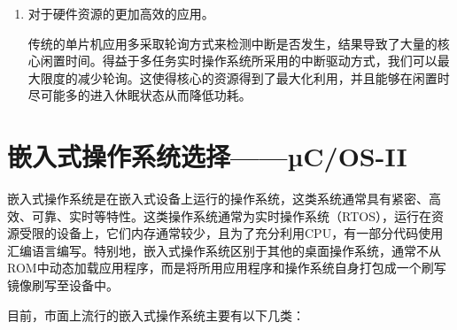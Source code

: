 \documentclass{ctexart}
\begin{document}
\begin{enumerate}
  \item 对于硬件资源的更加高效的应用。\par
    传统的单片机应用多采取轮询方式来检测中断是否发生，结果导致了大量的核心闲置时间。得益于多任务实时操作系统所采用的中断驱动方式，我们可以最大限度的减少轮询。这使得核心的资源得到了最大化利用，并且能够在闲置时尽可能多的进入休眠状态从而降低功耗。\cite{rtos_in_mcu}
\end{enumerate}

\section{嵌入式操作系统选择——µC/OS-II}

嵌入式操作系统是在嵌入式设备上运行的操作系统，这类系统通常具有紧密、高效、可靠、实时等特性。\cite{wiki01}这类操作系统通常为实时操作系统（RTOS），运行在资源受限的设备上，它们内存通常较少，且为了充分利用CPU，有一部分代码使用汇编语言编写。特别地，嵌入式操作系统区别于其他的桌面操作系统，通常不从ROM中动态加载应用程序，而是将所用应用程序和操作系统自身打包成一个刷写镜像刷写至设备中。\par
目前，市面上流行的嵌入式操作系统主要有以下几类：\cite{os}\par
\end{document}
